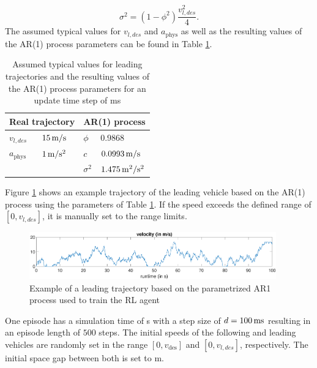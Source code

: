 \documentclass[review]{elsarticle}
\providecommand{\sub}[1]{_{\mathrm{#1}}}  %
\providecommand{\3}{{\ss}}
\begin{document}
\begin{equation}
\sigma^2=(1-\phi^2)\frac{v_{l,des}^2}{4}.
\end{equation}
The assumed typical values for $v_{l,des}$ and  $a\sub{phys}$ as well as the resulting values of the AR(1) process parameters can be found in Table \ref{tab:AR1Parameters}.
%
\begin{table}
	\caption{Assumed typical values for leading trajectories and
		the resulting values of the AR(1) process parameters for an
		update time step of \unit[100]{ms}} 
	\label{tab:AR1Parameters} 
	\begin{center}
		\begin{tabular}{ p{} p{} |p{} p{}  }
			\multicolumn{2}{c|}{Real trajectory} & \multicolumn{2}{c}{AR(1) process}   \\ \hline
			$v_{l,des}$ &$\unit[15]{m/s}$ &$\phi$ & $0.9868$\\
			$a\sub{phys}$ &$\unit[1]{m/s^2}$ &$c$ & $\unit[0.0993]{m/s}$\\
			& & $\sigma^2$ & $\unit[1.475]{m^2/s^2}$
			
		\end{tabular}
	\end{center}
\end{table}
%
Figure \ref{fig:AR1process} shows an example trajectory of the leading vehicle based on the AR(1) process using the parameters of Table \ref{tab:AR1Parameters}. If the speed exceeds the defined range of $[0, v_{l,des}]$, it is manually set to the range limits.
\begin{figure}
	\centering
	\includegraphics[width=0.95\textwidth]{images/AR1process}
	\caption{Example of a leading trajectory based on the parametrized AR1 process used to train the RL agent}
	\label{fig:AR1process}
\end{figure}
%
%
%
One episode has a simulation time of \unit[50]{s} with a step size of
$d=\unit[100]{ms}$ resulting in an episode length of $500$
steps. The initial speeds of the following and leading vehicles are
randomly set in the range $[0,v\sub{des}]$ and $[0,v_{l,des}]$,
respectively. The initial space gap between both is set to \unit[120]{m}. 
\end{document}
